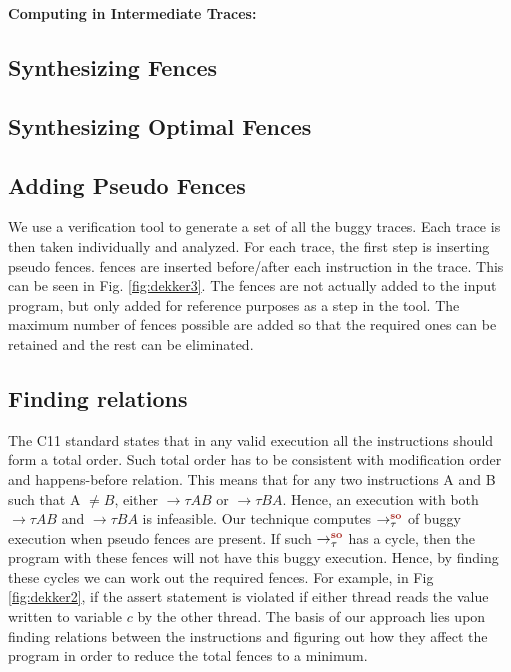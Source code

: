 \noindent\textbf{Computing \lso in Intermediate Traces:}


\subsection{Synthesizing Fences}

\subsection{Synthesizing Optimal Fences}


\subsection{Adding Pseudo Fences}
\par
We use a verification tool to generate a set of all the buggy traces. 
Each trace is then taken individually and analyzed. For each trace, 
the first step is inserting pseudo fences. \mosc fences are inserted 
before/after each instruction in the trace. This can be seen in 
Fig. \ref{fig:dekker3}. The fences are not actually added to the 
input program, but only added for reference purposes as a step in 
the tool. The maximum number of fences possible are added so that 
the required ones can be retained and the rest can be eliminated.

\subsection{Finding relations}
The C11 standard \cite{C11} states that in any valid execution 
all the \mosc instructions should form a total order. Such total order
has to be consistent with modification order and 
happens-before relation. This means that for any two \mosc instructions A 
and B such that A $ \neq B $, either $\to{\tau}{A}{B}$ or $\to{\tau}{B}{A}$. 
Hence, an execution with both $\to{\tau}{A}{B}$ and $\to{\tau}{B}{A}$ is infeasible.
Our technique computes $\setSO$ of buggy execution when pseudo fences are 
present. If such $\setSO$ has a cycle, then the program with these fences 
will not have this buggy execution. 
Hence, by finding these cycles we can work out the required fences.
For example, in Fig \ref{fig:dekker2}, if the assert statement is violated
if either thread reads the value written to variable $c$ by the other thread.
The basis of our approach lies upon finding relations between the 
instructions and figuring out how they affect the program in order to 
reduce the total fences to a minimum. 

